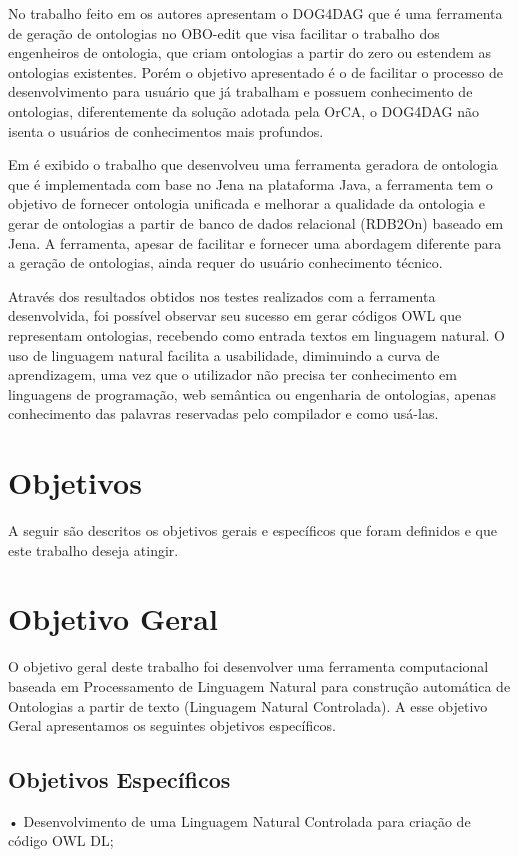 \documentclass{bcc}
\begin{document}
No trabalho feito em \cite{wachter2011} os autores apresentam o DOG4DAG que é uma ferramenta de geração de ontologias no OBO-edit \cite{day2007} que visa facilitar o trabalho dos engenheiros de ontologia, que criam ontologias a partir do zero ou estendem as ontologias existentes. Porém o objetivo apresentado é o de facilitar o processo de desenvolvimento para usuário que já trabalham e possuem conhecimento de ontologias, diferentemente da solução adotada pela OrCA, o DOG4DAG não isenta o usuários de conhecimentos mais profundos.

Em \cite{zhou2010} é exibido o trabalho que desenvolveu uma ferramenta geradora de ontologia que é implementada com base no Jena na plataforma Java, a ferramenta tem o objetivo de fornecer ontologia unificada e melhorar a qualidade da ontologia e gerar de ontologias a partir de banco de dados relacional (RDB2On) baseado em Jena\cite{jena}. A ferramenta, apesar de facilitar e fornecer uma abordagem diferente para a geração de ontologias, ainda requer do usuário conhecimento técnico.

Através dos resultados obtidos nos testes realizados com a ferramenta desenvolvida, foi possível observar seu sucesso em gerar códigos OWL que representam ontologias, recebendo como entrada textos em linguagem natural. O uso de linguagem natural facilita a usabilidade, diminuindo a curva de aprendizagem, uma vez que o utilizador não precisa ter conhecimento em linguagens de programação, web semântica ou engenharia de ontologias, apenas conhecimento das palavras reservadas pelo compilador e como usá-las.


\section{Objetivos}

A seguir são descritos os objetivos gerais e específicos que foram definidos e que este trabalho deseja atingir.

\section{Objetivo Geral}
O objetivo geral deste trabalho foi desenvolver uma ferramenta computacional baseada em Processamento de Linguagem Natural para construção automática de Ontologias a partir de texto (Linguagem Natural Controlada). A esse objetivo Geral apresentamos os seguintes objetivos específicos.

\subsection{Objetivos Específicos}
•	Desenvolvimento de uma Linguagem Natural Controlada para criação de código OWL DL;
\end{document}
